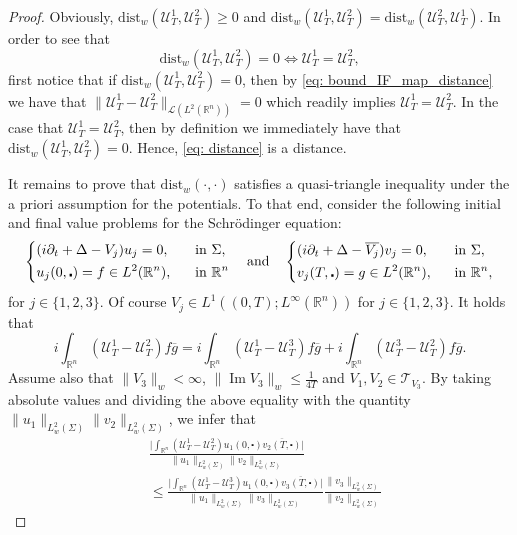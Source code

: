 \documentclass[10pt,a4paper]{amsart}
\theoremstyle{remark}
\theoremstyle{definition}
\newcommand{\R}{\mathbb{R}}
\newcommand{\dist}{\mathrm{dist}}
\def\Im{\mathop\mathrm{Im}}
\def\cal{\mathcal}
\def\ovl{\overline}
\def\cd{\centerdot}
\def\d{\partial}
\begin{document}
\begin{proof}
Obviously, $\dist_{w}(\cal{U}_T^1, \cal{U}_T^2) \geq 0$ and $\dist_{w}(\cal{U}_T^1, \cal{U}_T^2) = \dist_{w}(\cal{U}_T^2, \cal{U}_T^1)$. In order to see that 
%
\[
\dist_{w}(\cal{U}_T^1, \cal{U}_T^2) = 0 \Longleftrightarrow \cal{U}_T^1 = \cal{U}_T^2,
\]
%
first notice that if $\dist_{w}(\cal{U}_T^1, \cal{U}_T^2) = 0$, then by \eqref{eq: bound_IF_map_distance} we have that $\| \cal{U}_T^1 - \cal{U}_T^2\|_{\cal{L}(L^2(\R^n))} = 0$ which readily implies $\cal{U}_T^1=\cal{U}_T^2$. 
%
In the case that $\cal{U}_T^1 = \cal{U}_T^2$, then by definition we immediately have that $\dist_{w}(\cal{U}_T^1, \cal{U}_T^2) = 0$. 
Hence, \eqref{eq: distance} is a distance.

It remains to prove that $\dist_w(\cdot, \cdot)$ satisfies a quasi-triangle inequality under the a priori assumption for the potentials. 
To that end, consider the following initial and final value problems for the Schr\"odinger equation:
%
\[
\begin{dcases}
(i\d_t+\Delta - V_j)u_j = 0, \quad &\textup{in}\,\, \Sigma, \\
u_j(0, \cd) = f \in L^2(\R^n), &\textup{in}\,\, \R^n
\end{dcases} 
%
\quad \textup{and} \quad
%
\begin{dcases}
(i\d_t+\Delta - \ovl{V_j})v_j = 0, \quad &\textup{in}\,\, \Sigma, \\
v_j(T, \cd) = g\in L^2(\R^n), &\textup{in}\,\, \R^n,
\end{dcases} 
\]
%
for $ j\in \{1, 2, 3\}$. Of course $V_j \in L^1((0, T); L^\infty(\R^n))$ for $j\in\{ 1, 2, 3 \}$. 
%
It holds that 
%
\[
i \int_{\R^n} (\cal{U}^1_T -\cal{U}^2_T) f \ovl{g} = i\int_{\R^n} (\cal{U}^1_T - \cal{U}^3_T)f\ovl{g} + i \int_{\R^n}(\cal{U}_T^3-\cal{U}^2_T)f \ovl{g}.
\]
%
Assume also that $\|V_3\|_w<\infty$, $\| \Im V_3 \|_w \leq \frac{1}{4T}$ and $V_1, V_2 \in \cal{T}_{V_3}$.
By taking absolute values and dividing the above equality with the quantity $\|u_1\|_{L^2_w(\Sigma)} \|v_2\|_{L^2_w(\Sigma)}$, we infer that
%
\begin{align*}
&\frac{\Big| \displaystyle \int_{\R^n} (\cal{U}^1_T -\cal{U}^2_T) u_1(0, \cd) \ovl{v_2(T, \cd)}\Big|}{\|u_1\|_{L^2_w(\Sigma)} \|v_2\|_{L^2_w(\Sigma)}} \\
%
&\leq \frac{\Big| \displaystyle \int_{\R^n} (\cal{U}^1_T -\cal{U}^3_T) u_1(0, \cd) \ovl{v_3(T, \cd)}\Big|}{\|u_1\|_{L^2_w(\Sigma)} \|v_3\|_{L^2_w(\Sigma)}} \frac{\|v_3\|_{L^2_w(\Sigma)}}{\|v_2\|_{L^2_w(\Sigma)}}

\end{align*}
\end{proof}
\end{document}
